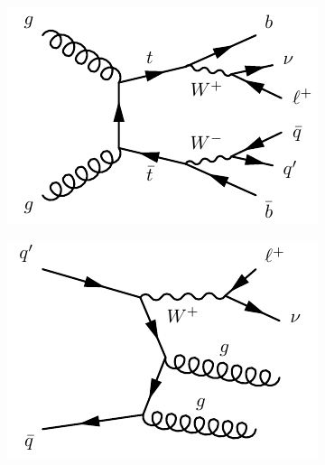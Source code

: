 \begin{figure}
	\centering
	\begin{subfigure}[b]{0.3\linewidth}
		\centering\includegraphics[width=\textwidth]{ttbar}
		\caption{\label{fig:ttbar}}
	\end{subfigure}\quad
	\begin{subfigure}[b]{0.3\linewidth}
		\centering\includegraphics[width=\textwidth]{wjets}
		\caption{\label{fig:wjets}}
	\end{subfigure}\quad
	\begin{subfigure}[b]{0.3\linewidth}

\end{subfigure}
\end{figure}
